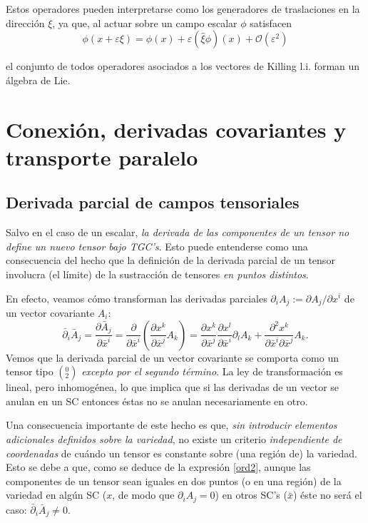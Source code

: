 Estos operadores pueden interpretarse como los generadores de traslaciones en la dirección $\xi$, ya que, al actuar sobre un campo escalar $\phi$ satisfacen
\begin{equation}
\phi(x+\varepsilon\xi) = \phi(x) + \varepsilon(\hat{\xi}\phi)(x) + \mathcal{O}(\varepsilon^2)
\end{equation}

 el conjunto de todos operadores asociados a los vectores de Killing l.i. forman un álgebra de Lie.

\section{Conexión, derivadas covariantes y transporte paralelo}

\subsection{Derivada parcial de campos tensoriales}

Salvo en el caso de un escalar, \textit{la derivada de las componentes de un tensor no define un nuevo tensor bajo TGC's}. Esto puede entenderse como una consecuencia del hecho que la definición de la derivada parcial de un tensor involucra (el límite) de la sustracción de tensores \textit{en puntos distintos}.

En efecto, veamos cómo transforman las derivadas parciales $\partial_i
A_j:={\partial A_j}/{\partial x^i}$ de un vector covariante $A_i$:
\begin{equation}
\bar{\partial}_i\bar{A}_j=\frac{\partial \bar{A}_j}{\partial
\bar{x}^i}=\frac{\partial}{\partial \bar{x}^i}\left(\frac{\partial x^k
}{\partial\bar{x}^j}A_k \right)
=\frac{\partial x^k}{\partial\bar{x}^j}\frac{\partial x^l}{\partial\bar{x}^i}
\partial_l A_k +\frac{\partial^2 x^k}{\partial\bar
{x}^i \partial\bar{x}^j}A_k . \label{ord2}
\end{equation}
Vemos que la derivada parcial de un vector covariante se comporta como un tensor tipo $(_2^0)$ \textit{excepto por el segundo término}. La ley de
transformación es lineal, pero inhomogénea, lo que implica que si las
derivadas de un vector se anulan en un SC entonces éstas no se anulan
necesariamente en otro.

Una consecuencia importante de este hecho es que, \textit{sin introducir elementos adicionales definidos sobre la variedad}, no existe un criterio \textit{independiente de coordenadas} de cuándo un tensor es constante sobre (una región de) la variedad. Esto se debe a que, como se deduce de la expresión \eqref{ord2}, aunque las componentes de un tensor sean iguales en dos puntos (o en una región) de la variedad en algún SC ($x$, de modo que $\partial_iA_j=0$) en otros SC's ($\bar{x}$) éste no será el caso: $\bar{\partial}_i\bar{A}_j\neq 0$.
 
